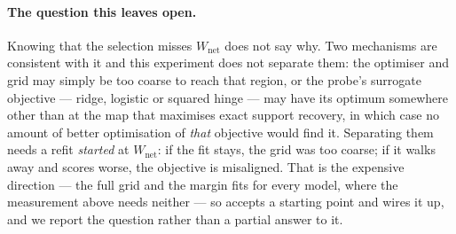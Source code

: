 \paragraph{The question this leaves open.} Knowing that the selection misses $W_{\mathrm{net}}$ does
not say why. Two mechanisms are consistent with it and this experiment does not separate them: the
optimiser and grid may simply be too coarse to reach that region, or the probe's surrogate objective
--- ridge, logistic or squared hinge --- may have its optimum somewhere other than at the map that
maximises exact support recovery, in which case no amount of better optimisation of \emph{that}
objective would find it. Separating them needs a refit \emph{started} at $W_{\mathrm{net}}$: if the
fit stays, the grid was too coarse; if it walks away and scores worse, the objective is misaligned.
That is the expensive direction --- the full grid and the margin fits for every model, where the
measurement above needs neither --- so  accepts a starting point and
 wires it up, and we report the question rather than a partial
answer to it.
